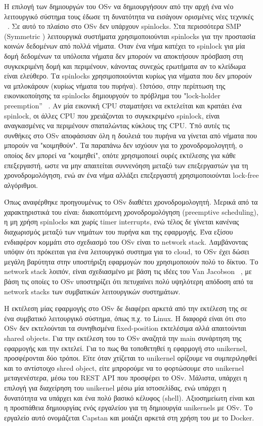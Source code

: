 Η επιλογή των δημιουργών του OSv να δημιουργήσουν από την αρχή ένα νέο
λειτουργικό σύστημα τους έδωσε τη δυνατότητα να εισάγουν ορισμένες νέες
τεχνικές ~\cite{kivity2014v}. Σε αυτό το πλαίσιο στο OSv δεν υπάρχουν
spinlocks. Στα περισσότερα SMP (Symmetric )
λειτουργικά συστήματα χρησιμοποιούνται spinlocks για την προστασία κοινών
δεδομένων από πολλά νήματα. Όταν ένα νήμα κατέχει το spinlock για μία δομή
δεδομένων τα υπόλοιπα νήματα δεν μπορούν να αποκτήσουν πρόσβαση στη συγκεκριμένη
δομή και περιμένουν, κάνοντας συνεχώς ερωτήματα αν το κλείδωμα είναι ελεύθερο.
Τα spinlocks χρησιμοποιούνται κυρίως για νήματα που δεν μπορούν να μπλοκάρουν
(κυρίως νήματα του πυρήνα). Ωστόσο, στην περίπτωση της εικονικοποίησης τα
spinlocks δημιουργούν το πρόβλημα του "lock-holder preemption”
~\cite{uhlig2004towards}. Αν μία εικονική CPU σταματήσει να εκτελείται και
κρατάει ένα spinlock, οι άλλες CPU που χρειάζονται το συγκεκριμένο spinlock,
είναι αναγκασμένες να περιμένουν σπαταλώντας κύκλους της CPU. Υπό αυτές τις
συνθήκες στο OSv αποφάσισαν όλη η δουλειά του πυρήνα να γίνεται από νήματα που
μπορούν να "κοιμηθούν". Τα παραπάνω δεν ισχύουν για το χρονοδρομολογητή, ο
οποίος δεν μπορεί να "κοιμηθεί", οπότε χρησιμοποιεί ουρές εκτέλεσης για κάθε
επεξεργαστή, ωστε να μην απαιτείται συννενόηση μεταξύ των επεξεργαστών για τη
χρονοδρομολόγηση, ενώ αν ένα νήμα αλλάξει επεξεργαστή χρησιμοποιούνται lock-free
αλγόριθμοι.

Όπως αναφέρθηκε προηγουμένως το OSv διαθέτει χρονοδρομολογητή. Μερικά από τα
χαρακτηριστικά του είναι: διακοπτόμενη χρονοδρομολόγηση (preemptive scheduling),
η μη χρήση spinlocks και χωρίς timer interrupts, ενώ τέλος δε γίνεται κανένας
διαχωρισμός μεταξύ των νημάτων του πυρήνα και της εφαρμογής. Ένα εξίσου
ενδιαφέρον κομμάτι στο σχεδιασμό του OSv είναι το network stack. Λαμβάνοντας
υπόψιν ότι πρόκειται για ένα λειτουργικό συστημα για το cloud, το OSv έχει δώσει
μεγάλη βαρύτητα στην υποστήριξη εφαρμογών που χρησιμοποιούν πολύ το δίκτυο. Το
network stack λοιπόν, είναι σχεδιασμένο με βάση τις ιδέες του Van Jacobson
~\cite{jacobson2006speeding}, με βάση τις οποίες το OSv υποστηρίζει ότι
πετυχαίνει πολύ υψηλότερη απόδοση από τα network stacks των συμβατικών
λειτουργικών συστημάτων. 

H εκτέλεση μίας εφαρμογής στο OSv δε διαφέρει αρκετά από την εκτέλεση της σε ένα
συμβατικό λειτουργικό σύστημα, όπως π.χ. το Linux. Η διαφορά είναι ότι στο OSv
δεν εκτελούνται τα συνηθισμένα fixed-position εκτελέσιμα αλλά απαιτούνται shared
objects. Για την εκτέλεση του το OSv αναζητά την main συνάρτηση της εφαρμογής
και την εκτελεί. Για το πως θα τοποθετηθεί η εφαρμογή στο unikernel,
προσφέρονται δύο τρόποι. Εϊτε όταν χτίζεται το unikernel ορίζουμε να
συμπεριληφθεί και το αντίστοιχο shred object, είτε μπρορούμε να το φορτώσουμε
στο unikernel μεταγενέστερα, μέσω του REST API που προσφέρει το OSv. Μάλιστα,
υπάρχει η επιλογή για διαχείρηση του unikernel μέσω μία ιστοσελίδας, ενώ υπάρχει
η δυνατότητα να υπάρχει και ένα πολύ βασικό κέλυφος (shell). Αξιοσημείωτη είναι και η
προσπάθεια δημιουργίας ενός εργαλείου για τη δημιουργία unikernels με OSv. Το
εργαλείο αυτό ονομάζεται Capstan και μοιάζει αρκετά στη χρήση του με το Docker.

